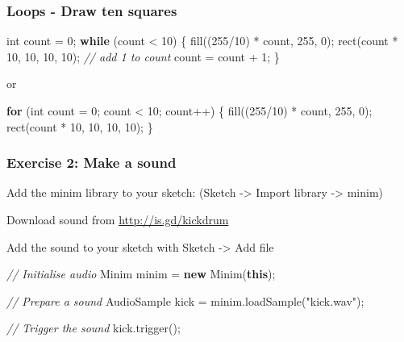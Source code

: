 \documentclass[ignorenonframetext,]{beamer}
\newenvironment{Shaded}{}{}
\newcommand{\KeywordTok}[1]{\textcolor[rgb]{0.00,0.44,0.13}{\textbf{{#1}}}}
\newcommand{\DataTypeTok}[1]{\textcolor[rgb]{0.56,0.13,0.00}{{#1}}}
\newcommand{\DecValTok}[1]{\textcolor[rgb]{0.25,0.63,0.44}{{#1}}}
\newcommand{\StringTok}[1]{\textcolor[rgb]{0.25,0.44,0.63}{{#1}}}
\newcommand{\CommentTok}[1]{\textcolor[rgb]{0.38,0.63,0.69}{\textit{{#1}}}}
\newcommand{\FunctionTok}[1]{\textcolor[rgb]{0.02,0.16,0.49}{{#1}}}
\newcommand{\NormalTok}[1]{{#1}}
\begin{document}
\begin{frame}[fragile]\frametitle{Loops - Draw ten squares}

\begin{Shaded}
\begin{Highlighting}[]
\DataTypeTok{int} \NormalTok{count = }\DecValTok{0}\NormalTok{;}
\KeywordTok{while} \NormalTok{(count < }\DecValTok{10}\NormalTok{) \{}
  \FunctionTok{fill}\NormalTok{((}\DecValTok{255}\NormalTok{/}\DecValTok{10}\NormalTok{) * count, }\DecValTok{255}\NormalTok{, }\DecValTok{0}\NormalTok{);}
  \FunctionTok{rect}\NormalTok{(count * }\DecValTok{10}\NormalTok{, }\DecValTok{10}\NormalTok{, }\DecValTok{10}\NormalTok{, }\DecValTok{10}\NormalTok{);}
  \CommentTok{// add 1 to count}
  \NormalTok{count = count + }\DecValTok{1}\NormalTok{;}
\NormalTok{\} }
\end{Highlighting}
\end{Shaded}

or

\begin{Shaded}
\begin{Highlighting}[]
\KeywordTok{for} \NormalTok{(}\DataTypeTok{int} \NormalTok{count = }\DecValTok{0}\NormalTok{; count < }\DecValTok{10}\NormalTok{; count++) \{}
  \FunctionTok{fill}\NormalTok{((}\DecValTok{255}\NormalTok{/}\DecValTok{10}\NormalTok{) * count, }\DecValTok{255}\NormalTok{, }\DecValTok{0}\NormalTok{);}
  \FunctionTok{rect}\NormalTok{(count * }\DecValTok{10}\NormalTok{, }\DecValTok{10}\NormalTok{, }\DecValTok{10}\NormalTok{, }\DecValTok{10}\NormalTok{);}
\NormalTok{\} }
\end{Highlighting}
\end{Shaded}

\end{frame}

\begin{frame}[fragile]\frametitle{Exercise 2: Make a sound}

Add the minim library to your sketch: (Sketch -\textgreater{} Import
library -\textgreater{} minim)

Download sound from \url{http://is.gd/kickdrum}

Add the sound to your sketch with Sketch -\textgreater{} Add file

\begin{Shaded}
\begin{Highlighting}[]
\CommentTok{// Initialise audio}
\NormalTok{Minim minim = }\KeywordTok{new} \FunctionTok{Minim}\NormalTok{(}\KeywordTok{this}\NormalTok{);}

\CommentTok{// Prepare a sound}
\NormalTok{AudioSample kick = minim.}\FunctionTok{loadSample}\NormalTok{(}\StringTok{"kick.wav"}\NormalTok{);}

\CommentTok{// Trigger the sound}
\NormalTok{kick.}\FunctionTok{trigger}\NormalTok{();}
\end{Highlighting}
\end{Shaded}

\end{frame}
\end{document}
